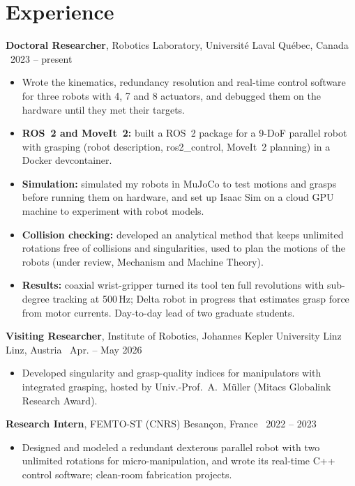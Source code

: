 \documentclass[10pt,letterpaper]{article}
\newcommand{\role}[4]{\textbf{#1}, #2 \hfill {\color{muted}#3 \textbar\ #4}\par}
\begin{document}
\section{Experience}
\role{Doctoral Researcher}{Robotics Laboratory, Universit\'e Laval}{Qu\'ebec, Canada}{2023 -- present}
\begin{itemize}
\item Wrote the kinematics, redundancy resolution and real-time control software for three robots with 4, 7 and 8
actuators, and debugged them on the hardware until they met their targets.
\item \textbf{ROS~2 and MoveIt~2:} built a ROS~2 package for a 9-DoF parallel robot with grasping (robot description,
ros2\_control, MoveIt~2 planning) in a Docker devcontainer.
\item \textbf{Simulation:} simulated my robots in MuJoCo to test motions and grasps before running them on hardware, and
set up Isaac Sim on a cloud GPU machine to experiment with robot models.
\item \textbf{Collision checking:} developed an analytical method that keeps unlimited rotations free of collisions and
singularities, used to plan the motions of the robots (under review, Mechanism and Machine Theory).
\item \textbf{Results:} coaxial wrist-gripper turned its tool ten full revolutions with sub-degree tracking at 500\,Hz;
Delta robot in progress that estimates grasp force from motor currents. Day-to-day lead of two graduate students.
\end{itemize}

\vspace{3pt}
\role{Visiting Researcher}{Institute of Robotics, Johannes Kepler University Linz}{Linz, Austria}{Apr. -- May 2026}
\begin{itemize}
\item Developed singularity and grasp-quality indices for manipulators with integrated grasping, hosted by Univ.-Prof.~A.~M\"uller (Mitacs Globalink Research Award).
\end{itemize}

\vspace{3pt}
\role{Research Intern}{FEMTO-ST (CNRS)}{Besan\c{c}on, France}{2022 -- 2023}
\begin{itemize}
\item Designed and modeled a redundant dexterous parallel robot with two unlimited rotations for micro-manipulation, and wrote its real-time C++ control software; clean-room fabrication projects.
\end{itemize}
\end{document}
